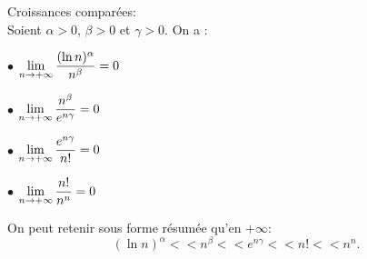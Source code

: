 \documentclass[a4paper, 11pt]{article}
\begin{document}
\begin{theorem} Croissances compar\'ees:\\
Soient $\alpha>0$, $\beta>0$ et $\gamma>0$. On a  :
\begin{itemize}
\begin{minipage}[t]{0.45\textwidth}
\item[$\bullet$] $\lim\limits_{n\to +\infty} \displaystyle \frac{(\ln n)^\alpha}{n^\beta} =  0 $\vspace{0.3cm}
\item[$\bullet$]  $\lim\limits_{n\to +\infty} \displaystyle \frac{n^\beta}{e^{n \gamma}} =  0$ \vspace{0.3cm}
\end{minipage} 
\quad
\begin{minipage}[t]{0.45\textwidth}
\item[$\bullet$]  $\lim\limits_{n\to +\infty} \displaystyle \frac{e^{n \gamma}}{n!} =  0$\vspace{0.3cm}
\item[$\bullet$]  $\lim\limits_{n\to +\infty} \displaystyle \frac{n!}{n^n} =  0 $\vspace{0.3cm}
\end{minipage}
\end{itemize}
On peut retenir sous forme r\'esum\'ee qu'en $+\infty$:
$$(\ln{n})^{\alpha} <<n^{\beta}<<e^{n\gamma}<<n!<<n^n.$$
\end{theorem}
\end{document}
